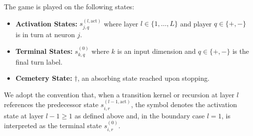 \begin{definition}\label{ptnb:def:adf-game-states} The game is played on the following states:
\begin{itemize}
    \item \textbf{Activation States:} $s_{j,q}^{(l, \mathrm{act})}$ where layer $l \in \{1, \dots, L\}$ and
        player $q \in \{+,-\}$ is in turn at neuron $j$.
    \item \textbf{Terminal States:} $s_{k,q}^{(0)}$ where $k$ is an input dimension and $q \in \{+,-\}$ is
        the final turn label.
    \item \textbf{Cemetery State:} $\dagger$, an absorbing state reached upon stopping.
\end{itemize}
We adopt the convention that, when a transition kernel or recursion at layer $l$ references the
predecessor state $s_{i,r}^{(l-1, \mathrm{act})}$, the symbol denotes the activation state at layer
$l-1 \ge 1$ as defined above and, in the boundary case $l = 1$, is interpreted as the terminal
state $s_{i,r}^{(0)}$.
\end{definition}

